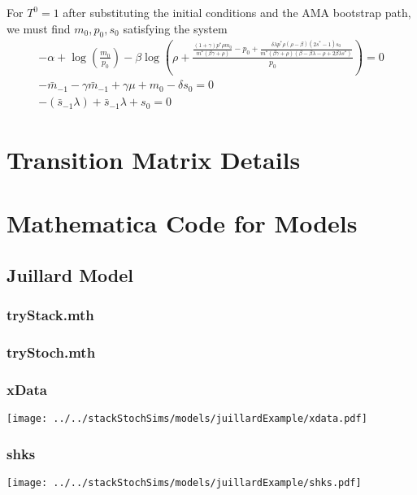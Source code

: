\documentclass[12pt]{article}
\begin{document}
For $T^0=1$ after substituting the initial conditions and the
AMA bootstrap path, we must find $m_0,p_0,s_0$ satisfying the system
\begin{gather*}
-\alpha + \log(\frac{m_0}{p_0}) - \beta \log(\rho + \frac{\frac{(1+\gamma)p^\ast \rho m_0}{m^\ast(\beta \gamma + \rho)}- p_0 +\frac{\delta\lambda p^\ast \rho(\rho - \beta)(2 s^\ast -1)s_0}{m^\ast(\beta \gamma + \rho)(\beta - \beta \lambda -\rho + 2 \beta \lambda s^\ast)}}{p_0})=0\\
  -\bar{m}_{-1} - \gamma \bar{m}_{-1} + \gamma \mu + m_0 - \delta s_0 = 0\\
-(\bar{s}_{-1} \lambda) + \bar{s}_{-1}  \lambda + s_0 = 0
\end{gather*}
\section{Transition Matrix Details}
\label{transMat}
%
\section{Mathematica Code for Models}






\subsection{Juillard Model}
\label{sec:juillard-model-}

\subsubsection{tryStack.mth}
\label{sec:trystack.mth}



\subsubsection{tryStoch.mth}
\label{sec:trystack.mth}



\subsubsection{xData}
\label{sec:xdata}

\texttt{[image: ../../stackStochSims/models/juillardExample/xdata.pdf]}

\subsubsection{shks}
\label{sec:xdata}

\texttt{[image: ../../stackStochSims/models/juillardExample/shks.pdf]}
\end{document}
